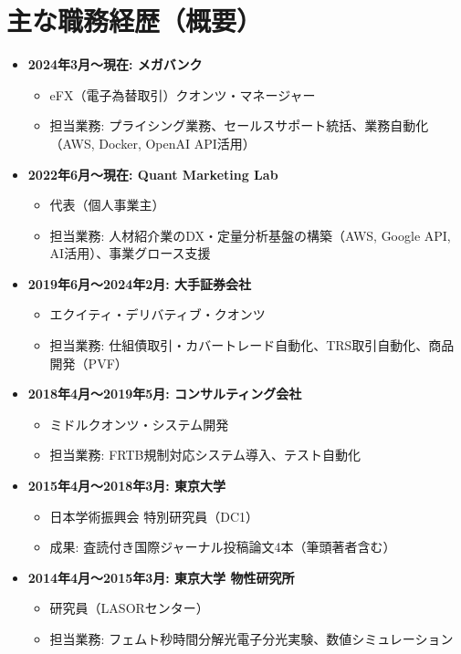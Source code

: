 \documentclass[uplatex,a4j,10.5pt,dvipdfmx]{jsarticle}
\begin{document}
\section{主な職務経歴（概要）}
\begin{itemize}[leftmargin=*]
    \item \textbf{2024年3月～現在: メガバンク}
        \begin{itemize}
            \item eFX（電子為替取引）クオンツ・マネージャー
            \item 担当業務: プライシング業務、セールスサポート統括、業務自動化（AWS, Docker, OpenAI API活用）
        \end{itemize}
    \item \textbf{2022年6月～現在: Quant Marketing Lab}
        \begin{itemize}
            \item 代表（個人事業主）
            \item 担当業務: 人材紹介業のDX・定量分析基盤の構築（AWS, Google API, AI活用）、事業グロース支援
        \end{itemize}
    \item \textbf{2019年6月～2024年2月: 大手証券会社}
        \begin{itemize}
            \item エクイティ・デリバティブ・クオンツ
            \item 担当業務: 仕組債取引・カバートレード自動化、TRS取引自動化、商品開発（PVF）
        \end{itemize}
    \item \textbf{2018年4月～2019年5月: コンサルティング会社}
        \begin{itemize}
            \item ミドルクオンツ・システム開発
            \item 担当業務: FRTB規制対応システム導入、テスト自動化
        \end{itemize}
    \item \textbf{2015年4月～2018年3月: 東京大学}
        \begin{itemize}
            \item 日本学術振興会 特別研究員（DC1）
            \item 成果: 査読付き国際ジャーナル投稿論文4本（筆頭著者含む）
        \end{itemize}
    \item \textbf{2014年4月～2015年3月: 東京大学 物性研究所}
        \begin{itemize}
            \item 研究員（LASORセンター）
            \item 担当業務: フェムト秒時間分解光電子分光実験、数値シミュレーション
        \end{itemize}
\end{itemize}
\end{document}
